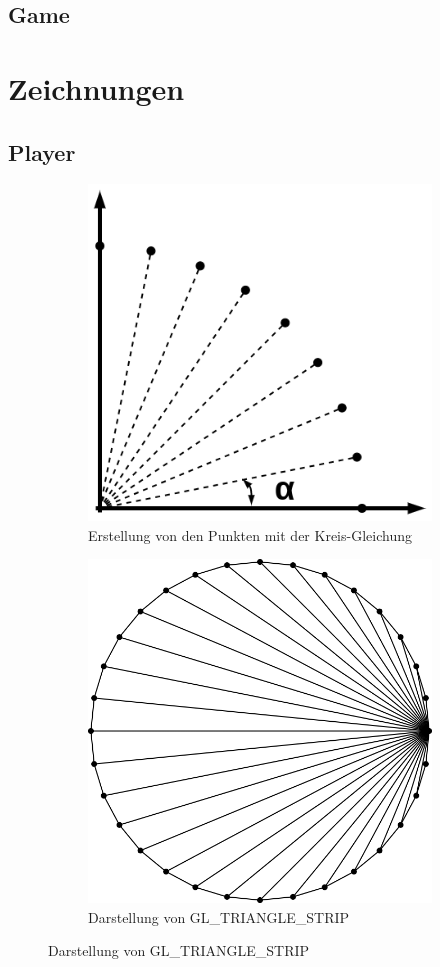 \documentclass[doktyp=studarbeit]{TUBAFarbeiten}
\begin{document}
\subsection{Game}

\section{Zeichnungen}

\subsection{Player}
\begin{figure}[!htb]
    \centering
    \begin{subfigure}[b]{0.4\textwidth}
        \centering
        \includegraphics[width=0.8\linewidth]{kreis-1.png}
        \caption{Erstellung von den Punkten mit der Kreis-Gleichung}
    \end{subfigure}
    \begin{subfigure}[b]{0.4\textwidth}
        \centering
        \includegraphics[width=0.8\linewidth]{kreis-2.png}
        \caption{Darstellung von GL\_TRIANGLE\_STRIP}
    \end{subfigure}
	\label{fig:circle}
\end{figure}
\end{document}
